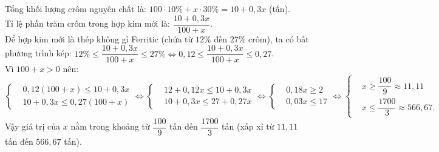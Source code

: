 \begin{bt}
{\begin{enumerate}[a)]
    Tổng khối lượng crôm nguyên chất là:
    $100 \cdot 10\% + x \cdot 30\% = 10 + 0{,}3x$ (tấn).\\
    Tỉ lệ phần trăm crôm trong hợp kim mới là:
    $\dfrac{10 + 0{,}3x}{100 + x}$.\\
    Để hợp kim mới là thép không gỉ Ferritic (chứa từ $12\%$ đến $27\%$ crôm), ta có bất phương trình kép:
    $12\% \le \dfrac{10 + 0{,}3x}{100 + x} \le 27\% \Leftrightarrow 0{,}12 \le \dfrac{10 + 0{,}3x}{100 + x} \le 0{,}27$.\\
    Vì $100 + x > 0$ nên:
    $\left\{\begin{aligned} &0{,}12(100 + x) \le 10 + 0{,}3x \\ &10 + 0{,}3x \le 0{,}27(100 + x) \end{aligned}\right. \Leftrightarrow \left\{\begin{aligned} &12 + 0{,}12x \le 10 + 0{,}3x \\ &10 + 0{,}3x \le 27 + 0{,}27x \end{aligned}\right. \Leftrightarrow \left\{\begin{aligned} &0{,}18x \ge 2 \\ &0{,}03x \le 17 \end{aligned}\right. \Leftrightarrow \left\{\begin{aligned} &x \ge \dfrac{100}{9} \approx 11{,}11 \\ &x \le \dfrac{1700}{3} \approx 566{,}67. \end{aligned}\right.$\\
    Vậy giá trị của $x$ nằm trong khoảng từ $\dfrac{100}{9}$ tấn đến $\dfrac{1700}{3}$ tấn (xấp xỉ từ $11{,}11$ tấn đến $566{,}67$ tấn).
\end{enumerate}
}
\end{bt}

